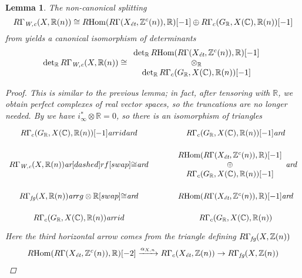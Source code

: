 \documentclass[10pt,a4paper,oneside,draft]{article}
\DeclareMathOperator{\Hom}{Hom}
\newcommand{\CC}{\mathbb{C}}
\newcommand{\RR}{\mathbb{R}}
\newcommand{\ZZ}{\mathbb{Z}}
\renewcommand{\det}{\operatorname{det}}
\newcommand{\ar}{\text{\it ar}}
\newcommand{\et}{\text{\it \'{e}t}}
\newcommand{\fg}{\text{\it fg}}
\newcommand{\Wc}{\text{\it W,c}}
\newcommand{\RHom}{R\!\Hom}
\theoremstyle{myplain}
\newtheorem{lemma}[theorem]{Lemma}
\theoremstyle{mydefinition}
\numberwithin{equation}{section}
\begin{document}
\begin{lemma}
  The non-canonical splitting
  \[ R\Gamma_\Wc (X, \RR(n)) \cong
    \RHom (R\Gamma (X_\et, \ZZ^c (n)), \RR) [-1] \oplus
    R\Gamma_c (G_\RR, X (\CC), \RR (n)) [-1] \]
  from \cite[Proposition~7.13]{Beshenov-Weil-etale-1} yields a canonical
  isomorphism of determinants
  \[ \det_\RR R\Gamma_\Wc (X, \RR (n)) \cong
    \begin{array}{c}
      \det_\RR \RHom (R\Gamma (X_\et, \ZZ^c (n)), \RR) [-1] \\
      \otimes_\RR \\
      \det_\RR R\Gamma_c (G_\RR, X (\CC), \RR (n)) [-1]
    \end{array} \]

  \begin{proof}
    This is similar to the previous lemma; in fact, after tensoring with $\RR$,
    we obtain perfect complexes of real vector spaces, so the truncations are no
    longer needed. By \cite[Proposition~7.4]{Beshenov-Weil-etale-1} we have
    $i_\infty^* \otimes \RR = 0$, so there is an isomorphism of triangles
    \begin{equation}
      \label{eqn:splitting-of-RGamma-Wc-triangles}
      \begin{tikzcd}[row sep=1em]
        R\Gamma_c (G_\RR, X (\CC), \RR (n)) [-1] \ar{r}{id}\ar{d} & R\Gamma_c (G_\RR, X (\CC), \RR (n)) [-1]\ar{d} \\
        R\Gamma_\Wc (X, \RR (n)) \ar[dashed]{r}{f}[swap]{\cong}\ar{d} & \begin{array}{c} \RHom (R\Gamma (X_\et, \ZZ^c (n)), \RR) [-1] \\ \oplus \\ R\Gamma_c (G_\RR, X (\CC), \RR (n)) [-1] \end{array}\ar{d} \\
        R\Gamma_\fg (X, \RR (n)) \ar{r}{g\otimes \RR}[swap]{\cong}\ar{d} & \RHom (R\Gamma (X_\et, \ZZ^c (n)), \RR) [-1] \ar{d} \\
        R\Gamma_c (G_\RR, X (\CC), \RR (n)) \ar{r}{id} & R\Gamma_c (G_\RR, X (\CC), \RR (n))
      \end{tikzcd}
    \end{equation}
    Here the third horizontal arrow comes from the triangle defining
    $R\Gamma_\fg (X, \ZZ(n))$
    \begin{multline*}
      \RHom (R\Gamma (X_\et, \ZZ^c (n)), \RR) [-2] \xrightarrow{\alpha_{X,n}}
      R\Gamma_c (X_\et, \ZZ (n)) \to
      R\Gamma_\fg (X, \ZZ(n)) \\

\end{multline*}
\end{proof}
\end{lemma}
\end{document}
